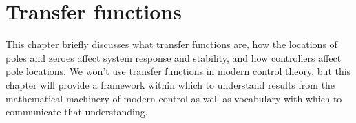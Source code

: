 
\chapter{Transfer functions}

This chapter briefly discusses what transfer functions are, how the locations of
poles and zeroes affect \gls{system response} and stability, and how controllers
affect pole locations. We won't use transfer functions in modern control theory,
but this chapter will provide a framework within which to understand results
from the mathematical machinery of modern control as well as vocabulary with
which to communicate that understanding.

\renewcommand*{\chapterpath}{\partpath/transfer-functions}






